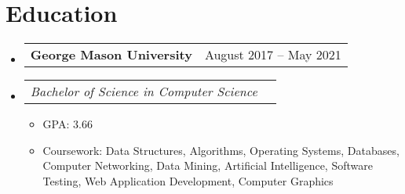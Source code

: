 \documentclass[letterpaper,11pt]{article}
\makeatletter
\newcommand{\resumeItem}[1]{
  \item\small{
    {#1 \vspace{-2pt}}
  }
}
\newcommand{\resumeSubheading}[2]{
  \vspace{-2pt}\item
    \begin{tabular*}{0.97\textwidth}[t]{l@{\extracolsep{\fill}}r}
      \textbf{#1} & #2 \\
    \end{tabular*}\vspace{-7pt}
}
\newcommand{\resumeSubSubheading}[1]{
    \item
    \begin{tabular*}{0.97\textwidth}{l@{\extracolsep{\fill}}r}
      \textit{#1} \\
    \end{tabular*}\vspace{-7pt}
}
\newcommand{\resumeSubHeadingListStart}{\begin{itemize}[leftmargin=0.15in, label={}]}
\newcommand{\resumeSubHeadingListEnd}{\end{itemize}}
\newcommand{\resumeItemListStart}{\begin{itemize}}
\newcommand{\resumeItemListEnd}{\end{itemize}\vspace{-5pt}}
\makeatother
\begin{document}
\section{Education}
  \resumeSubHeadingListStart
    \resumeSubheading
      {George Mason University}{August 2017 -- May 2021}
      \resumeSubSubheading
        {Bachelor of Science in Computer Science}
        \resumeItemListStart
          \resumeItem{GPA: 3.66}
          \resumeItem{Coursework: Data Structures, Algorithms, Operating Systems, Databases, Computer Networking, Data Mining, Artificial Intelligence, Software Testing, Web Application Development, Computer Graphics}
        \resumeItemListEnd
  \resumeSubHeadingListEnd
\end{document}
